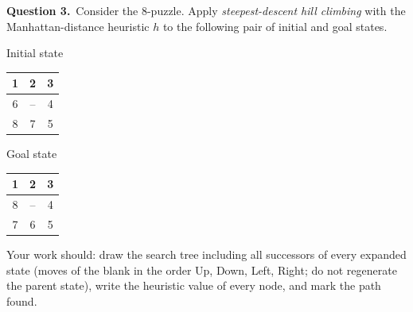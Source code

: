 \documentclass[11pt,a4paper]{article}
\newcommand{\question}[1]{\par\medskip\noindent\textbf{Question #1.}\ }
\begin{document}
\question{3}Consider the 8-puzzle. Apply \emph{steepest-descent hill climbing} with the Manhattan-distance heuristic $h$ to the following pair of initial and goal states.\begin{center}Initial state\quad \begin{tabular}{|c|c|c|}\hline 1 & 2 & 3\\\hline 6 & -- & 4\\\hline 8 & 7 & 5\\\hline\end{tabular}\qquad\qquad Goal state\quad \begin{tabular}{|c|c|c|}\hline 1 & 2 & 3\\\hline 8 & -- & 4\\\hline 7 & 6 & 5\\\hline\end{tabular}\end{center}Your work should: draw the search tree including all successors of every expanded state (moves of the blank in the order Up, Down, Left, Right; do not regenerate the parent state), write the heuristic value of every node, and mark the path found.
\par\smallskip\noindent 
\end{document}
